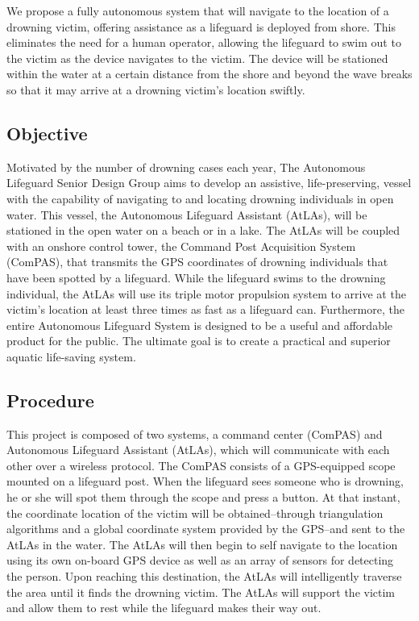 \documentclass[11pt]{article}
\begin{document}
We propose a fully autonomous system that will navigate to the location of a drowning victim, offering assistance as a lifeguard is deployed from shore. This eliminates the need for a human operator, allowing the lifeguard to swim out to the victim as the device navigates to the victim. The device will be stationed within the water at a certain distance from the shore and beyond the wave breaks so that it may arrive at a drowning victim's location swiftly.

\subsection*{Objective}

Motivated by the number of drowning cases each year, The Autonomous Lifeguard Senior Design Group aims to develop an assistive, life-preserving, vessel with the capability of navigating to and locating drowning individuals in open water. This vessel, the Autonomous Lifeguard Assistant (AtLAs), will be stationed in the open water on a beach or in a lake. The AtLAs will be coupled with an onshore control tower, the Command Post Acquisition System (ComPAS), that transmits the GPS coordinates of drowning individuals that have been spotted by a lifeguard. While the lifeguard swims to the drowning individual, the AtLAs will use its triple motor propulsion system to arrive at the victim's location at least three times as fast as a lifeguard can. Furthermore, the entire Autonomous Lifeguard System is designed to be a useful and affordable product for the public. The ultimate goal is to create a practical and superior aquatic life-saving system.

\subsection*{Procedure}
This project is composed of two systems, a command center (ComPAS) and Autonomous Lifeguard Assistant (AtLAs), which will communicate with each other over a wireless protocol. The ComPAS consists of a GPS-equipped scope mounted on a lifeguard post. When the lifeguard sees someone who is drowning, he or she will spot them through the scope and press a button. At that instant, the coordinate location of the victim will be obtained--through triangulation algorithms and a global coordinate system provided by the GPS--and sent to the AtLAs in the water. The AtLAs will then begin to self navigate to the location using its own on-board GPS device as well as an array of sensors for detecting the person. Upon reaching this destination, the AtLAs will intelligently traverse the area until it finds the drowning victim. The AtLAs will support the victim and allow them to rest while the lifeguard makes their way out.\\
\end{document}
